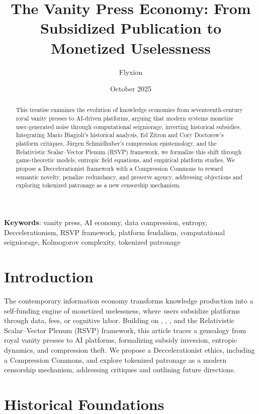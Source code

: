 \documentclass[12pt]{article}
\title{The Vanity Press Economy: From Subsidized Publication to Monetized Uselessness}
\author{Flyxion}
\date{October 2025}
\begin{document}
\maketitle

\begin{abstract}
This treatise examines the evolution of knowledge economies from seventeenth-century royal vanity presses to AI-driven platforms, arguing that modern systems monetize user-generated noise through computational seigniorage, inverting historical subsidies. Integrating Mario Biagioli’s historical analysis, Ed Zitron and Cory Doctorow’s platform critiques, Jürgen Schmidhuber’s compression epistemology, and the Relativistic Scalar–Vector Plenum (RSVP) framework, we formalize this shift through game-theoretic models, entropic field equations, and empirical platform studies. We propose a Deccelerationist framework with a Compression Commons to reward semantic novelty, penalize redundancy, and preserve agency, addressing objections and exploring tokenized patronage as a new censorship mechanism.
\end{abstract}

\textbf{Keywords}: vanity press, AI economy, data compression, entropy, Deccelerationism, RSVP framework, platform feudalism, computational seigniorage, Kolmogorov complexity, tokenized patronage

\printglossaries

\section{Introduction}

The contemporary information economy transforms knowledge production into a self-funding engine of monetized uselessness, where users subsidize platforms through data, fees, or cognitive labor. Building on \citet{Biagioli2002}, \citet{Zitron2023Rot,Doctorow2023}, \citet{Schmidhuber2009}, and the Relativistic Scalar–Vector Plenum (RSVP) framework, this article traces a genealogy from royal vanity presses to AI platforms, formalizing subsidy inversion, entropic dynamics, and compression theft. We propose a Deccelerationist ethics, including a Compression Commons, and explore tokenized patronage as a modern censorship mechanism, addressing critiques and outlining future directions.

\section{Historical Foundations}
\end{document}
